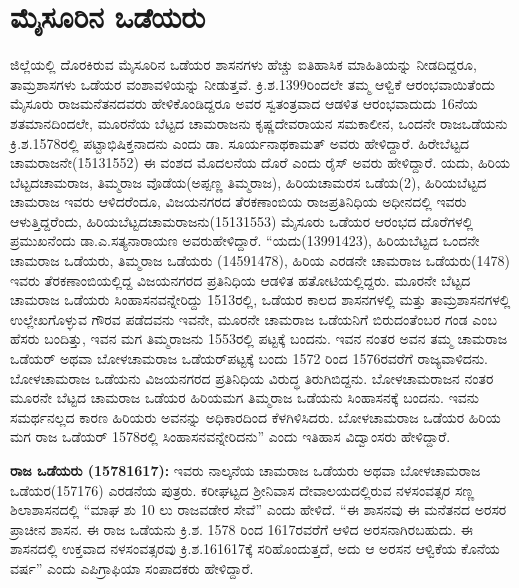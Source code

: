 \section{ಮೈಸೂರಿನ ಒಡೆಯರು}

ಜಿಲ್ಲೆಯಲ್ಲಿ ದೊರಕಿರುವ ಮೈಸೂರಿನ ಒಡೆಯರ ಶಾಸನಗಳು ಹೆಚ್ಚು ಐತಿಹಾಸಿಕ ಮಾಹಿತಿಯನ್ನು ನೀಡದಿದ್ದರೂ, ತಾಮ್ರಶಾಸಗಳು ಒಡೆಯರ ವಂಶಾವಳಿಯನ್ನು ನೀಡುತ್ತವೆ. ಕ್ರಿ.ಶ.1399ರಿಂದಲೇ ತಮ್ಮ ಆಳ್ವಿಕೆ ಆರಂಭವಾಯಿತೆಂದು ಮೈಸೂರು ರಾಜಮನೆತನ\-ದವರು ಹೇಳಿಕೊಂಡಿದ್ದರೂ ಅವರ ಸ್ವತಂತ್ರವಾದ ಆಡಳಿತ ಆರಂಭವಾದುದು 16ನೆಯ ಶತಮಾನದಿಂದಲೇ, ಮೂರನೆಯ ಬೆಟ್ಟದ ಚಾಮರಾಜನು ಕೃಷ್ಣದೇವರಾಯನ ಸಮಕಾಲೀನ, ಒಂದನೇ ರಾಜಒಡೆಯನು ಕ್ರಿ.ಶ.1578ರಲ್ಲಿ ಪಟ್ಟಾಭಿಷಿಕ್ತನಾದನು ಎಂದು ಡಾ. ಸೂರ್ಯನಾಥಕಾಮತ್​ ಅವರು ಹೇಳಿದ್ದಾರೆ. ಹಿರೇಬೆಟ್ಟದ ಚಾಮರಾಜನೇ(1513\enginline{-}1552) ಈ ವಂಶದ ಮೊದಲನೆಯ ದೊರೆ ಎಂದು ರೈಸ್​ ಅವರು ಹೇಳಿದ್ದಾರೆ. ಯದು, ಹಿರಿಯ ಬೆಟ್ಟದಚಾಮರಾಜ, ತಿಮ್ಮರಾಜ ವೊಡೆಯ(ಅಪ್ಪಣ್ಣ ತಿಮ್ಮರಾಜ), ಹಿರಿಯಚಾಮರಸ ಒಡೆಯ(2), ಹಿರಿಯಬೆಟ್ಟದ ಚಾಮರಾಜ ಇವರು ಆಳಿದರೆಂದೂ, ವಿಜಯನಗರದ ತೆರಕಣಾಂಬಿಯ ರಾಜಪ್ರತಿನಿಧಿಯ ಅಧೀನದಲ್ಲಿ ಇವರು ಆಳುತ್ತಿದ್ದರೆಂದು, ಹಿರಿಯಬೆಟ್ಟದಚಾಮರಾಜನು\break (1513\enginline{-}1553) ಮೈಸೂರು ಒಡೆಯರ ಆರಂಭದ ದೊರೆಗಳಲ್ಲಿ ಪ್ರಮುಖನೆಂದು ಡಾ.ಎ.ಸತ್ಯನಾರಾಯಣ ಅವರು\break ಹೇಳಿದ್ದಾರೆ. “ಯದು(1399\enginline{-}1423), ಹಿರಿಯಬೆಟ್ಟದ ಒಂದನೇ ಚಾಮರಾಜ ಒಡೆಯರು, ತಿಮ್ಮರಾಜ ಒಡೆಯರು (1459\enginline{-}1478), ಹಿರಿಯ ಎರಡನೇ ಚಾಮರಾಜ ಒಡೆಯರು(1478) ಇವರು ತೆರಕಣಾಂಬಿಯಲ್ಲಿದ್ದ ವಿಜಯನಗರದ ಪ್ರತಿನಿಧಿಯ ಆಡಳಿತ ಹತೋಟಿಯಲ್ಲಿದ್ದರು. ಮೂರನೇ ಬೆಟ್ಟದ ಚಾಮರಾಜ ಒಡೆಯರು ಸಿಂಹಾಸನವನ್ನೇರಿದ್ದು 1513ರಲ್ಲಿ, ಒಡೆಯರ ಕಾಲದ ಶಾಸನಗಳಲ್ಲಿ ಮತ್ತು ತಾಮ್ರಶಾಸನಗಳಲ್ಲಿ ಉಲ್ಲೇಖಗೊಳ್ಳುವ ಗೌರವ ಪಡೆದವನು ಇವನೇ, ಮೂರನೇ ಚಾಮರಾಜ ಒಡೆಯನಿಗೆ ಬಿರುದಂತೆಂಬರ ಗಂಡ ಎಂಬ ಹೆಸರು ಬಂದಿತ್ತು, ಇವನ ಮಗ ತಿಮ್ಮರಾಜನು 1553ರಲ್ಲಿ ಪಟ್ಟಕ್ಕೆ ಬಂದನು. ಇವನ ನಂತರ ಅವನ ತಮ್ಮ ಚಾಮರಾಜ ಒಡೆಯರ್​ ಅಥವಾ ಬೋಳಚಾಮರಾಜ ಒಡೆಯರ್​ ಪಟ್ಟಕ್ಕೆ ಬಂದು 1572 ರಿಂದ 1576ರವರೆಗೆ ರಾಜ್ಯವಾಳಿದನು. ಬೋಳಚಾಮರಾಜ ಒಡೆಯನು ವಿಜಯನಗರದ ಪ್ರತಿನಿಧಿಯ ವಿರುದ್ಧ ತಿರುಗಿಬಿದ್ದನು. ಬೋಳಚಾಮರಾಜನ ನಂತರ ಮೂರನೇ ಬೆಟ್ಟದ ಚಾಮರಾಜ ಒಡೆಯರ ಹಿರಿಯಮಗ ತಿಮ್ಮರಾಜ ಒಡೆಯನು ಸಿಂಹಾಸನಕ್ಕೆ ಬಂದನು. ಇವನು ಸಮರ್ಥನಲ್ಲದ ಕಾರಣ ಹಿರಿಯರು ಅವನನ್ನು ಅಧಿಕಾರದಿಂದ ಕೆಳಗಿಳಿಸಿದರು. ಬೋಳಚಾಮರಾಜ ಒಡೆಯರ ಹಿರಿಯ ಮಗ ರಾಜ ಒಡೆಯರ್​ 1578ರಲ್ಲಿ ಸಿಂಹಾಸನವನ್ನೇರಿದನು” ಎಂದು ಇತಿಹಾಸ ವಿದ್ವಾಂಸರು ಹೇಳಿದ್ದಾರೆ.

\textbf{ರಾಜ ಒಡೆಯರು (1578\general{\enginline{-}}1617): } ಇವರು ನಾಲ್ಕನೆಯ ಚಾಮರಾಜ ಒಡೆಯರು ಅಥವಾ ಬೋಳಚಾಮರಾಜ ಒಡೆಯರ(1571\enginline{-}76) ಎರಡನೆಯ ಪುತ್ರರು. ಕರೀಘಟ್ಟದ ಶ‍್ರೀನಿವಾಸ ದೇವಾಲಯದಲ್ಲಿರುವ ನಳಸಂವತ್ಸರ ಸಣ್ಣ ಶಿಲಾಶಾಸನದಲ್ಲಿ “ಮಾಘ ಶು 10 ಲು ರಾಜವಡೇರ ಸೇವೆ” ಎಂದು ಹೇಳಿದೆ. “ಈ ಶಾಸನವು ಈ ಮನೆತನದ ಅರಸರ ಪ್ರಾಚೀನ ಶಾಸನ. ಈ ರಾಜ ಒಡೆಯನು ಕ್ರಿ.ಶ. 1578 ರಿಂದ 1617ರವರೆಗೆ ಆಳಿದ ಅರಸನಾಗಿರಬಹುದು. ಈ ಶಾಸನದಲ್ಲಿ ಉಕ್ತವಾದ ನಳಸಂವತ್ಸರವು ಕ್ರಿ.ಶ.1616\enginline{-}17ಕ್ಕೆ ಸರಿಹೊಂದುತ್ತದೆ, ಅದು ಆ ಅರಸನ ಆಳ್ವಿಕೆಯ ಕೊನೆಯ ವರ್ಷ” ಎಂದು ಎಪಿಗ್ರಾಫಿಯಾ ಸಂಪಾದಕರು ಹೇಳಿದ್ದಾರೆ.

